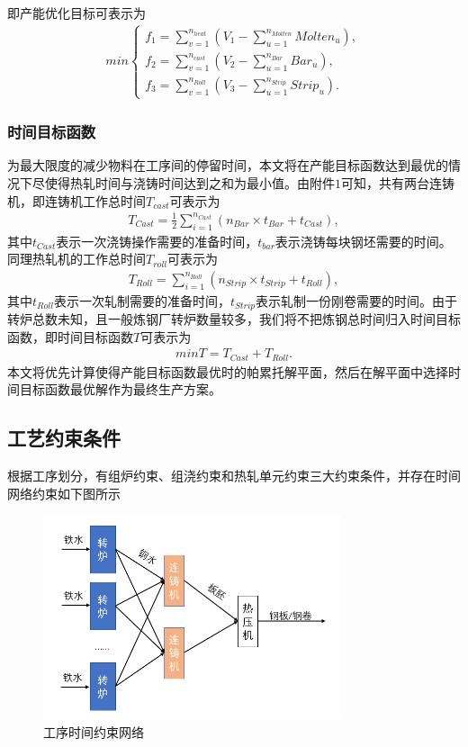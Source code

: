 \documentclass{whutmod}
\begin{document}
		即产能优化目标可表示为
			\begin{gather}
		min \left\{\begin{matrix}f_1=\sum_{v=1}^{n_{heat}}( V_1-\sum_{u=1}^{n_{Molten}} Molten_u),
			\\ f_2=\sum_{v=1}^{n_{cast}}( V_2-\sum_{u=1}^{n_{Bar}} Bar_u),
			\\ f_3=\sum_{v=1}^{n_{Roll}}( V_3-\sum_{u=1}^{n_{Strip}} Strip_u).
		\end{matrix}\right.
			\end{gather}
	   
		\subsubsection{时间目标函数}
		为最大限度的减少物料在工序间的停留时间，本文将在产能目标函数达到最优的情况下尽使得热轧时间与浇铸时间达到之和为最小值。由附件$1$可知，共有两台连铸机，即连铸机工作总时间$T_{cast}$可表示为
		\begin{gather*}
		T_{Cast}=\frac{1}{2}\sum_{i=1}^{n_{Cast}}(n_{Bar}\times t_{Bar}+t_{Cast}),
		\end{gather*}
		其中$t_{Cast}$表示一次浇铸操作需要的准备时间，$t_{bar}$表示浇铸每块钢坯需要的时间。同理热轧机的工作总时间$T_{roll}$可表示为
		\begin{gather*}
		T_{Roll}=\sum_{i=1}^{n_{Roll}}(n_{Strip}\times t_{Strip}+t_{Roll}),
		\end{gather*}
		其中$t_{Roll}$表示一次轧制需要的准备时间，$t_{Strip}$表示轧制一份刚卷需要的时间。由于转炉总数未知，且一般炼钢厂转炉数量较多，我们将不把炼钢总时间归入时间目标函数，即时间目标函数$T$可表示为
	    \begin{gather}
		minT=T_{Cast}+T_{Roll}.
		\end{gather}
		本文将优先计算使得产能目标函数最优时的帕累托解平面，然后在解平面中选择时间目标函数最优解作为最终生产方案。
		
			
		\subsection{工艺约束条件}
		根据工序划分，有组炉约束、组浇约束和热轧单元约束三大约束条件，并存在时间网络约束如下图所示
			\begin{figure}[H]
			\centering
			\includegraphics[height=6cm,width=.7\textwidth]{figures/faf.png}
			\caption{工序时间约束网络}\label{111sad1sssasdssss11}
		\end{figure}
		
\end{document}
